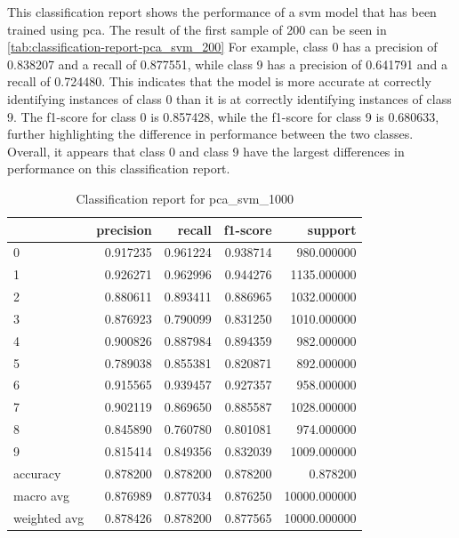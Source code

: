 This classification report shows the performance of a \gls{svm} model that has been trained using \gls{pca}. The result of the first sample of 200 can be seen in \ref{tab:classification-report-pca_svm_200}
For example, class 0 has a precision of 0.838207 and a recall of 0.877551, while class 9 has a precision of 0.641791 and a recall of 0.724480. This indicates that the model is more accurate at correctly identifying instances of class 0 than it is at correctly identifying instances of class 9. The f1-score for class 0 is 0.857428, while the f1-score for class 9 is 0.680633, further highlighting the difference in performance between the two classes. Overall, it appears that class 0 and class 9 have the largest differences in performance on this classification report.


\begin{table}[htb!]
    \centering
    \caption{Classification report for pca_svm_1000}
    \label{tab:classification-report-pca_svm_1000}
    \begin{tabular}{lrrrr}
    \toprule
     & precision & recall & f1-score & support \\
    \midrule
    0 & 0.917235 & 0.961224 & 0.938714 & 980.000000 \\
    1 & 0.926271 & 0.962996 & 0.944276 & 1135.000000 \\
    2 & 0.880611 & 0.893411 & 0.886965 & 1032.000000 \\
    3 & 0.876923 & 0.790099 & 0.831250 & 1010.000000 \\
    4 & 0.900826 & 0.887984 & 0.894359 & 982.000000 \\
    5 & 0.789038 & 0.855381 & 0.820871 & 892.000000 \\
    6 & 0.915565 & 0.939457 & 0.927357 & 958.000000 \\
    7 & 0.902119 & 0.869650 & 0.885587 & 1028.000000 \\
    8 & 0.845890 & 0.760780 & 0.801081 & 974.000000 \\
    9 & 0.815414 & 0.849356 & 0.832039 & 1009.000000 \\
    accuracy & 0.878200 & 0.878200 & 0.878200 & 0.878200 \\
    macro avg & 0.876989 & 0.877034 & 0.876250 & 10000.000000 \\
    weighted avg & 0.878426 & 0.878200 & 0.877565 & 10000.000000 \\
    \bottomrule
    \end{tabular}
    \end{table}

